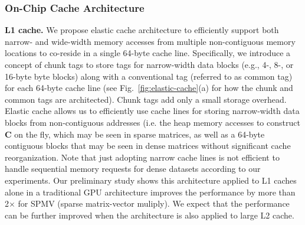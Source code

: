 \subsubsection{On-Chip Cache Architecture} 
\label{sec:memory:on-chip}
\noindent
\textbf{L1 cache.}
We propose elastic cache architecture to efficiently support both narrow- and wide-width memory accesses from multiple non-contiguous memory locations to co-reside in a single 64-byte cache line. 
Specifically, we introduce a concept of chunk tags to store tags for narrow-width data blocks (e.g., 4-, 8-, or 16-byte byte blocks) along with a conventional tag (referred to as common tag) for each 64-byte cache line (see Fig.~\ref{fig:elastic-cache}(a) for how the chunk and common tags are architected).  Chunk tags add only a small storage overhead. 
Elastic cache allows us to efficiently use cache lines for storing narrow-width data blocks from non-contiguous addresses (i.e. the heap memory accesses to construct \textbf{C} on the fly, 
which may be seen in sparse matrices, as well as a 64-byte contiguous blocks that may be seen in dense matrices without significant cache reorganization. 
Note that just adopting narrow cache lines is not efficient to handle sequential memory requests for dense datasets according to our experiments.
Our preliminary study shows this architecture applied to L1 caches alone in  a traditional GPU architecture improves the performance by more than 2$\times$ for SPMV (sparse matrix-vector muliply).
We expect that the performance can be further improved when the architecture is also applied to large L2 cache.

